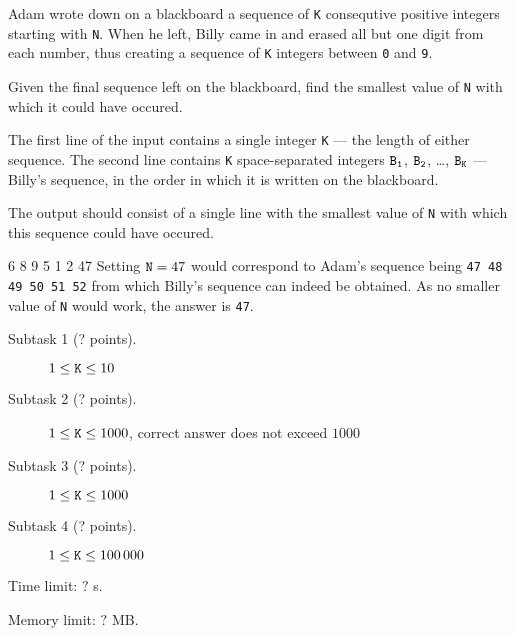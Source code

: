 \documentclass{boi2014}
\newcommand{\param}[1]{{\tt #1}}
\newcommand{\constant}[1]{{\tt #1}}
\begin{document}
    Adam wrote down on a blackboard a sequence of \param{K} consequtive
    positive integers starting with \param{N}. When he left, Billy came
    in and erased all but one digit from each number, thus creating a
    sequence of \param{K} integers between \constant{0} and \constant{9}.

    \Task

    Given the final sequence left on the blackboard, find the smallest
    value of \param{N} with which it could have occured.

    \Input

    The first line of the input contains a single integer \param{K} ---
    the length of either sequence. The second line contains \param{K}
    space-separated integers $\param{B_1}$, $\param{B_2}$, \dots, $\param{B_K}$
    --- Billy's sequence, in the order in which it is written on the blackboard.

    \Output

    The output should consist of a single line with the smallest value of
    \param{N} with which this sequence could have occured.

    \Example

    \example
    {
        6 8 9 5 1 2
    }
    {
        47
    }
    {
        Setting $\param{N}=47$ would correspond to Adam's sequence
        being \constant{47 48 49 50 51 52} from which Billy's sequence
        can indeed be obtained. As no smaller value of \param{N}
        would work, the answer is \constant{47}.
    }

\Scoring

\begin{description}
    \item[Subtask 1 (? points).] $1 \le \param{K} \le 10$
    \item[Subtask 2 (? points).] $1 \le \param{K} \le 1000$, correct
        answer does not exceed $1000$
    \item[Subtask 3 (? points).] $1 \le \param{K} \le 1000$
    \item[Subtask 4 (? points).] $1 \le \param{K} \le 100\,000$
\end{description}

\Constraints

Time limit: $?$ s.

Memory limit: $?$ MB.
\end{document}
